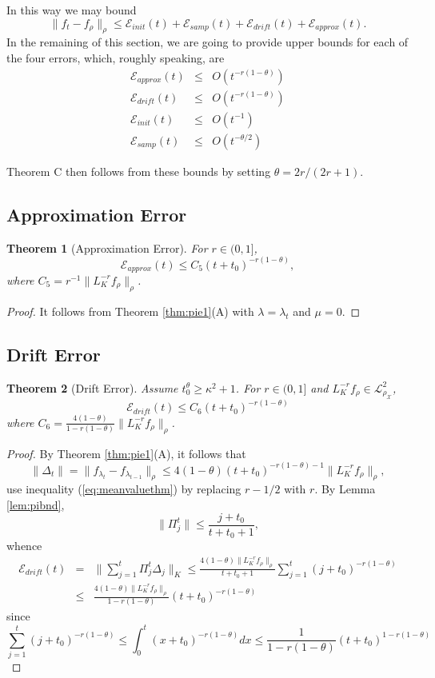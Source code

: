 \documentclass[twoside,11pt]{amsart}
\theoremstyle{theorem}
\newtheorem{thm}{Theorem}[section]
\theoremstyle{definition}
\theoremstyle{remark}
\newcommand{\DS}{\displaystyle}
\def\L{{\mathscr L}}
\def\L2{{\mathscr L}^2_{\rho_\X}}
\def\X{{\mathscr X}}
\def\Err{{\mathscr E}}
\def\t{t_0}
\def\la{\lambda}
\begin{document}
In this way we may bound
\[ \|f_t - f_\rho\|_\rho \leq \Err_{init}(t) + \Err_{samp}(t) + \Err_{drift}(t) + \Err_{approx}(t). \]
In the remaining of this section, we are going to provide upper bounds for each of the four errors, which, roughly speaking, are
\begin{eqnarray*} 
\Err_{approx}(t)  & \leq & O( t^{-r(1-\theta)} ) \\
 \Err_{drift}(t) & \leq & O( t^{-r(1-\theta)}) \\
 \Err_{init}(t) & \leq & O( t^{-1})  \\
 \Err_{samp}(t) & \leq & O( t^{-\theta/2} )
\end{eqnarray*}

Theorem C then follows from these bounds by setting $\theta=2r/(2r+1)$.

\subsection{Approximation Error}

\begin{thm}[Approximation Error]\label{err1:approx} For $r\in (0,1]$,
\[ \Err_{approx}(t)\leq C_5 (t+\t)^{-r(1-\theta)}, \]
where $C_5=r^{-1}\| L^{-r}_K f_\rho \|_\rho$.
\end{thm}
\begin{proof}
It follows from Theorem \ref{thm:pie1}(A) with $\la=\la_t$ and $\mu=0$. 
\end{proof}

\subsection{Drift Error}

\begin{thm}[Drift Error]\label{err1:drift} Assume $\t^\theta \geq \kappa^2+1$. For $r\in (0,1]$ and $L_K^{-r}f_\rho \in \L2$, 
\[ \Err_{drift}(t)\leq C_6 (t+\t)^{-r(1-\theta)} \]
where $\DS C_6=\frac{4(1-\theta)}{1-r(1-\theta)}\|L_K^{-r} f_\rho\|_\rho$.
\end{thm}

\begin{proof} By Theorem \ref{thm:pie1}(A), it follows that
\[ \|\Delta_t\| = \|f_{\lambda_t}-f_{\lambda_{t-1}}\|_\rho \leq 4(1-\theta) (t+\t)^{-r(1-\theta)-1} \|L_K^{-r} f_\rho\|_\rho, \]
use inequality (\ref{eq:meanvaluethm}) by replacing $r-1/2$ with $r$.
By Lemma \ref{lem:pibnd},
\[ \|\Pi_{j}^t\|\leq \frac{j+\t}{t+\t+1}, \]
whence
\begin{eqnarray*}
\Err_{drift}(t) &=& \| \sum_{j=1}^t \Pi_j^t \Delta_j\|_K \leq \frac{4(1-\theta)\|L_K^{-r} f_\rho\|_\rho }{t+\t+1}\sum_{j=1}^t 
 (j+\t)^{-r(1-\theta)}\\
 & \leq & \frac{4(1-\theta)\|L_K^{-r} f_\rho\|_\rho }{1-r(1-\theta)}  (t+\t)^{-r(1-\theta)}
\end{eqnarray*}
since
\[ \sum_{j=1}^t 
 (j+\t)^{-r(1-\theta)} \leq   \int_0^t (x+\t)^{-r(1-\theta)} dx \leq
\frac{1}{1-r(1-\theta)} (t+\t)^{1-r(1-\theta)} 
\]
\end{proof}
\end{document}
